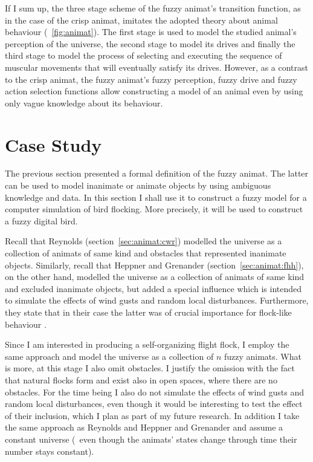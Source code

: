 If I sum up, the three stage scheme of the fuzzy animat's transition function, as in the case of the crisp animat, imitates the adopted theory about animal behaviour (\fig~\ref{fig:animat}). The first stage is used to model the studied animal's perception of the universe, the second stage to model its drives and finally the third stage to model the process of selecting and executing the sequence of muscular movements that will eventually satisfy its drives. However, as a contrast to the crisp animat, the fuzzy animat's fuzzy perception, fuzzy drive and fuzzy action selection functions allow constructing a model of an animal even by using only vague knowledge about its behaviour. 


\section{Case Study}
\label{sec:fuzzyAnimat:afd}
The previous section presented a formal definition of the fuzzy animat. The latter can be used to model inanimate or animate objects by using ambiguous knowledge and data. In this section I shall use it to construct a fuzzy model for a computer simulation of bird flocking. More precisely, it will be used to construct a fuzzy digital bird. 

Recall that Reynolds \cite{reynolds:1987} (section~\ref{sec:animat:cwr}) modelled the universe as a collection of animats of same kind and obstacles that represented inanimate objects. Similarly, recall that Heppner and Grenander \cite{heppner:1990} (section~\ref{sec:animat:fhh}), on the other hand, modelled the universe as a collection of animats of same kind and excluded inanimate objects, but added a special influence which is intended to simulate the effects of wind gusts and random local disturbances. Furthermore, they state that in their case the latter was of crucial importance for flock-like behaviour \cite{heppner:1990}.

Since I am interested in producing a self-organizing flight flock, I employ the same approach and model the universe as a collection of $n$ fuzzy animats. What is more, at this stage I also omit obstacles. I justify the omission with the fact that natural flocks form and exist also in open spaces, where there are no obstacles. For the time being I also do not simulate the effects of wind gusts and random local disturbances, even though it would be interesting to test the effect of their inclusion, which I plan as part of my future research. In addition I take the same approach as Reynolds \cite{reynolds:1987,reynolds:1999} and Heppner and Grenander \cite{heppner:1990} and assume a constant universe (\ie\ even though the animats' states change through time their number stays constant).

